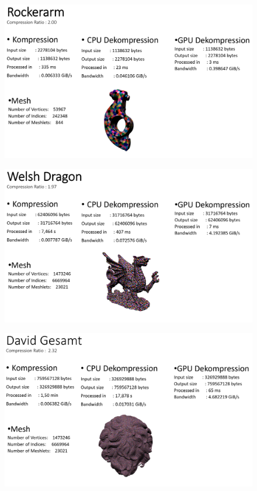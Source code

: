 \begin{figure}[h]
  \centering  
  \includegraphics[scale=0.28]{Bilder/ergebnisse_full/rockerarm.png}
\end{figure}
\begin{figure}[h]
  \centering  
  \includegraphics[scale=0.28]{Bilder/ergebnisse_full/welshdragon.png}
\end{figure}
\begin{figure}[h]
  \centering  
  \includegraphics[scale=0.28]{Bilder/ergebnisse_full/david.png}
\end{figure}
\clearpage
